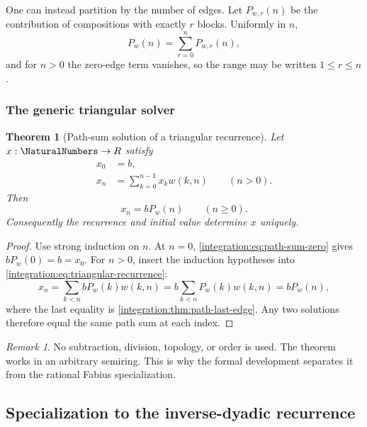 \documentclass[11pt,oneside]{article}
\newtheorem{theorem}{Theorem}[section]
\theoremstyle{definition}
\theoremstyle{remark}
\newtheorem{remark}[remark]{Remark}
\begin{document}
One can instead partition by the number of edges.  Let $P_{w,r}(n)$ be the contribution of
compositions with exactly $r$ blocks.  Uniformly in $n$,
\begin{equation}
 P_w(n)=\sum_{r=0}^{n}P_{w,r}(n),
 \label{integration:eq:path-length-uniform}
\end{equation}
and for $n>0$ the zero-edge term vanishes, so the range may be written $1\le r\le n$.

\subsubsection{The generic triangular solver}

\begin{theorem}[Path-sum solution of a triangular recurrence]
\label{integration:thm:triangular-path-solver}
Let $x:\NaturalNumbers\to R$ satisfy
\begin{align}
 x_0&=b,                                                    \label{integration:eq:triangular-initial}\\
 x_n&=\sum_{k=0}^{n-1}x_k w(k,n)\qquad(n>0).               \label{integration:eq:triangular-recurrence}
\end{align}
Then
\begin{equation}
 x_n=bP_w(n)
 \qquad(n\ge0).
 \label{integration:eq:triangular-path-solution}
\end{equation}
Consequently the recurrence and initial value determine $x$ uniquely.
\end{theorem}

\begin{proof}
Use strong induction on $n$.  At $n=0$, \eqref{integration:eq:path-sum-zero} gives
$bP_w(0)=b=x_0$.  For $n>0$, insert the induction hypotheses into
\eqref{integration:eq:triangular-recurrence}:
\[
 x_n=\sum_{k<n}bP_w(k)w(k,n)
 =b\sum_{k<n}P_w(k)w(k,n)
 =bP_w(n),
\]
where the last equality is \cref{integration:thm:path-last-edge}.  Any two solutions therefore equal the
same path sum at each index.
\end{proof}

\begin{remark}
No subtraction, division, topology, or order is used.  The theorem works in an arbitrary
semiring.  This is why the formal development separates it from the rational Fabius
specialization.
\end{remark}

\subsection{Specialization to the inverse-dyadic recurrence}
\label{integration:sec:fabius-composition-formula}
\end{document}
